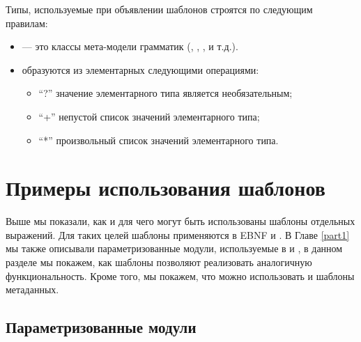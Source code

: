 Типы, используемые при объявлении шаблонов строятся по следующим правилам: 
\begin{itemize}
\item {} --- это классы мета-модели грамматик (, , ,  и т.д.).
\item {} образуются из элементарных следующими операциями:
	\begin{itemize}
		\item ``?'' значение элементарного типа является необязательным;
		\item ``+'' непустой список значений элементарного типа;
		\item ``*'' произвольный список значений элементарного типа.
	\end{itemize}
\end{itemize}

\section{Примеры использования шаблонов}

Выше мы показали, как и для чего могут быть использованы шаблоны отдельных выражений. Для таких целей шаблоны применяются в EBNF \cite{EBNF} и  \cite{Menhir}. В Главе \ref{part1} мы также описывали параметризованные модули, используемые в  и , в данном разделе мы покажем, как шаблоны  позволяют реализовать аналогичную функциональность. Кроме того, мы покажем, что можно использовать и шаблоны метаданных.

\subsection{Параметризованные модули}


